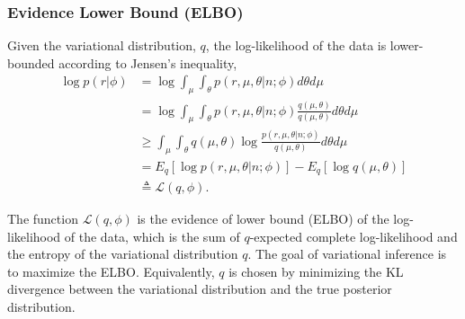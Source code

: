 \documentclass{bmcart}
\begin{document}
\subsubsection*{Evidence Lower Bound (ELBO)}
Given the variational distribution, $q$, the log-likelihood of the data is lower-bounded according to Jensen's inequality,
\begin{equation}
\begin{split}
\log p \left( r | \phi \right) &= \log \int_\mu \int_\theta p\left(r,\mu,\theta |n; \phi \right) d\theta d\mu \\
&= \log \int_\mu \int_\theta p\left(r,\mu,\theta |n; \phi \right)\frac{q\left(\mu,\theta \right) }{q\left(\mu,\theta \right) } d\theta d\mu \\
&\geq \int_\mu \int_\theta q\left(\mu,\theta \right) \log \frac{ p\left(r,\mu,\theta |n; \phi \right)}{q\left(\mu,\theta \right)} d\theta d\mu \\
&= E_q \left[ \log p\left(r,\mu,\theta |n; \phi \right)\right] - E_q \left[ \log q\left(\mu,\theta \right)\right] \\
&\triangleq \mathcal{L}(q, \phi).
\end{split}
\end{equation}

The function $\mathcal{L}(q, \phi)$ is the evidence of lower bound (ELBO) of the log-likelihood of the data, which is the sum of $q$-expected complete log-likelihood and the entropy of the variational distribution $q$.
The goal of variational inference is to maximize the ELBO.
Equivalently, $q$ is chosen by minimizing the KL divergence between the variational distribution and the true posterior distribution.
\end{document}
